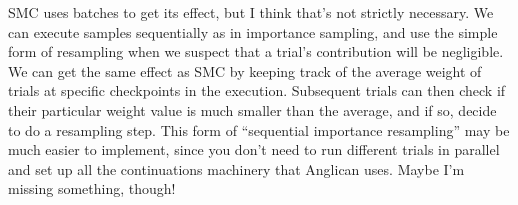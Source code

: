 \documentclass[a4paper, 11pt]{article}
\theoremstyle{definition}
\begin{document}
SMC uses batches to get its effect, but I think that's not strictly necessary. We can execute samples sequentially as in importance sampling, and use the simple form of resampling when we suspect that a trial's contribution will be negligible. We can get the same effect as SMC by keeping track of the average weight of trials at specific checkpoints in the execution. Subsequent trials can then check if their particular weight value is much smaller than the average, and if so, decide to do a resampling step. This form of ``sequential importance resampling'' may be much easier to implement, since you don't need to run different trials in parallel and set up all the continuations machinery that Anglican uses. Maybe I'm missing something, though!



\end{document}
